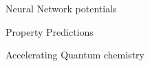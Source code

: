 \begin{frame}{Neural Network potentials}

\end{frame}
\begin{frame}{Property Predictions}

\end{frame}
\begin{frame}{Accelerating Quantum chemistry}

\end{frame}